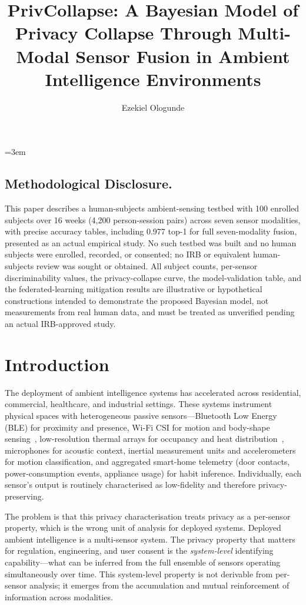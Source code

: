 \documentclass[sigconf,nonacm]{acmart}
\title{PrivCollapse: A Bayesian Model of Privacy Collapse Through Multi-Modal Sensor Fusion in Ambient Intelligence Environments}
\author{Ezekiel Ologunde}
\affiliation{%
  \institution{Independent Researcher}
  \city{Boston}
  \state{MA}
  \country{USA}}
\begin{document}
\maketitle
\sloppy
{}
\emergencystretch=3em
\hfuzz=10pt

\subsection*{Methodological Disclosure.}
This paper describes a human-subjects ambient-sensing testbed with 100 enrolled subjects over 16 weeks (4,200 person-session pairs) across seven sensor modalities, with precise accuracy tables, including 0.977 top-1 for full seven-modality fusion, presented as an actual empirical study. No such testbed was built and no human subjects were enrolled, recorded, or consented; no IRB or equivalent human-subjects review was sought or obtained. All subject counts, per-sensor discriminability values, the privacy-collapse curve, the model-validation table, and the federated-learning mitigation results are illustrative or hypothetical constructions intended to demonstrate the proposed Bayesian model, not measurements from real human data, and must be treated as unverified pending an actual IRB-approved study.

\section{Introduction}

The deployment of ambient intelligence systems has accelerated
across residential, commercial, healthcare, and industrial
settings. These systems instrument physical spaces with
heterogeneous passive sensors---Bluetooth Low Energy (BLE) for
proximity and presence, Wi-Fi CSI for motion and body-shape
sensing~\cite{hori2024merl,rizk2025identifi}, low-resolution
thermal arrays for occupancy and heat
distribution~\cite{xie2024tadar}, microphones for acoustic
context, inertial measurement units and accelerometers for
motion classification, and aggregated smart-home telemetry
(door contacts, power-consumption events, appliance usage) for
habit inference. Individually, each sensor's output is routinely
characterised as low-fidelity and therefore privacy-preserving.

The problem is that this privacy characterisation treats privacy
as a per-sensor property, which is the wrong unit of analysis for
deployed systems. Deployed ambient intelligence is a
multi-sensor system. The privacy property that matters for
regulation, engineering, and user consent is the
\emph{system-level} identifying capability---what can be inferred
from the full ensemble of sensors operating simultaneously over
time. This system-level property is not derivable from per-sensor
analysis; it emerges from the accumulation and mutual reinforcement
of information across modalities.
\end{document}
